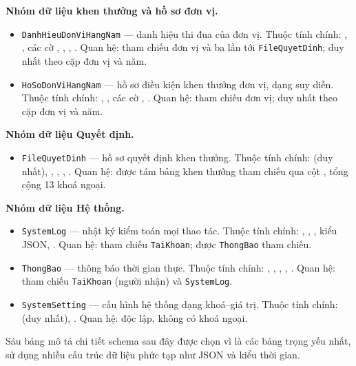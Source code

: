 \documentclass[../DoAn.tex]{subfiles}
\begin{document}
\textbf{Nhóm dữ liệu khen thưởng và hồ sơ đơn vị.}
\begin{itemize}
    \item \texttt{DanhHieuDonViHangNam} --- danh hiệu thi đua của đơn vị. Thuộc tính chính: , , các cờ , , , . Quan hệ: tham chiếu đơn vị và ba lần tới \texttt{FileQuyetDinh}; duy nhất theo cặp đơn vị và năm.
    \item \texttt{HoSoDonViHangNam} --- hồ sơ điều kiện khen thưởng đơn vị, dạng suy diễn. Thuộc tính chính: , , các cờ , . Quan hệ: tham chiếu đơn vị; duy nhất theo cặp đơn vị và năm.
\end{itemize}

\textbf{Nhóm dữ liệu Quyết định.}
\begin{itemize}
    \item \texttt{FileQuyetDinh} --- hồ sơ quyết định khen thưởng. Thuộc tính chính:  (duy nhất), , , , . Quan hệ: được tám bảng khen thưởng tham chiếu qua cột , tổng cộng 13 khoá ngoại.
\end{itemize}

\textbf{Nhóm dữ liệu Hệ thống.}
\begin{itemize}
    \item \texttt{SystemLog} --- nhật ký kiểm toán mọi thao tác. Thuộc tính chính: , , ,  kiểu JSON, . Quan hệ: tham chiếu \texttt{TaiKhoan}; được \texttt{ThongBao} tham chiếu.
    \item \texttt{ThongBao} --- thông báo thời gian thực. Thuộc tính chính: , , , , . Quan hệ: tham chiếu \texttt{TaiKhoan} (người nhận) và \texttt{SystemLog}.
    \item \texttt{SystemSetting} --- cấu hình hệ thống dạng khoá--giá trị. Thuộc tính chính:  (duy nhất), . Quan hệ: độc lập, không có khoá ngoại.
\end{itemize}

Sáu bảng mô tả chi tiết schema sau đây được chọn vì là các bảng trọng yếu nhất, sử dụng nhiều cấu trúc dữ liệu phức tạp như JSON và kiểu thời gian.
\end{document}
